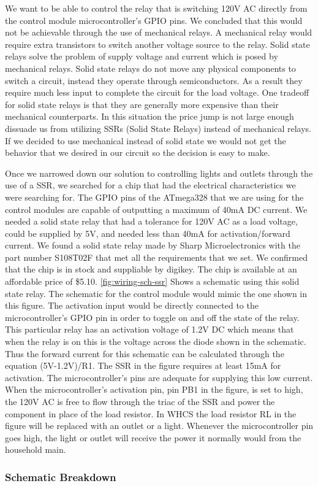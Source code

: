We want to be able to control the relay that is switching 120V AC directly from
the control module microcontroller{}'s GPIO pins. We concluded that this would
not be achievable through the use of mechanical relays. A mechanical relay
would require extra transistors to switch another voltage source to the relay.
Solid state relays solve the problem of supply voltage and current which is
posed by mechanical relays. Solid state relays do not move any physical
components to switch a circuit, instead they operate through semiconductors. As
a result they require much less input to complete the circuit for the load
voltage. One tradeoff for solid state relays is that they are generally more
expensive than their mechanical counterparts. In this situation the price jump
is not large enough dissuade us from utilizing SSRs (Solid State Relays)
instead of mechanical relays. If we decided to use mechanical instead of solid
state we would not get the behavior that we desired in our circuit so the
decision is easy to make.

Once we narrowed down our solution to controlling lights and outlets through
the use of a SSR, we searched for a chip that had the electrical
characteristics we were searching for. The GPIO pins of the ATmega328 that we
are using for the control modules are capable of outputting a maximum of 40mA
DC current. We needed a solid state relay that had a tolerance for 120V AC as a
load voltage, could be supplied by 5V, and needed less than 40mA for
activation/forward current. We found a solid state relay made by Sharp
Microelectronics with the part number S108T02F that met all the requirements
that we set. We confirmed that the chip is in stock and suppliable by digikey.
The chip is available at an affordable price of \$5.10. \autoref{fig:wiring-sch-ssr}
Shows a schematic using this solid state relay. The schematic for the control
module would mimic the one shown in this figure. The activation input would be
directly connected to the microcontroller{}'s GPIO pin in order to toggle on
and off the state of the relay. This particular relay has an activation voltage
of 1.2V DC which means that when the relay is on this is the voltage across the
diode shown in the schematic. Thus the forward current for this schematic can
be calculated through the equation (5V{}-1.2V)/R1. The SSR in the figure
requires at least 15mA for activation. The microcontroller{}'s pins are
adequate for supplying this low current. When the microcontroller{}'s
activation pin, pin PB1 in the figure, is set to high, the 120V AC is free to
flow through the triac of the SSR and power the component in place of the load
resistor. In WHCS the load resistor RL in the figure will be replaced with an
outlet or a light. Whenever the microcontroller pin goes high, the light or
outlet will receive the power it normally would from the household main.


\subsubsection{Schematic Breakdown}
